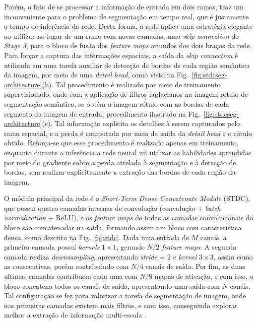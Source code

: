 \documentclass[conference]{IEEEtran}
\begin{document}
Porém, o fato de se processar a informação de entrada em dois ramos, traz um inconveniente para o problema de segmentação em tempo real, que é justamente o tempo de inferência da rede. Desta forma, a rede aplica uma estratégia elegante ao utilizar no lugar de um ramo com novas camadas, uma \textit{skip connection} do \textit{Stage 3}, para o bloco de fusão dos \textit{feature maps} oriundos dos dois braços da rede. Para forçar a captura das informações espaciais, a saída da \textit{skip connection} é utilizada em uma tarefa auxiliar de detecção de bordas de cada região semântica da imagem, por meio de uma \textit{detail head}, como visto na Fig.~\ref{fig:stdcseg-architecture}(b). Tal procedimento é realizado por meio de treinamento supervisionado, onde com a aplicação de filtros laplacianos na imagem rótulo de segmentação semântica, se obtém a imagem rótulo com as bordas de cada segmento da imagem de entrada, procedimento ilustrado na Fig.~\ref{fig:stdcseg-architecture}(c). Tal informação explicita os detalhes à serem capturados pelo ramo espacial, e a perda é computada por meio da saída da \textit{detail head} e o rótulo obtido. Reforça-se que esse procedimento é realizado apenas em treinamento, enquanto durante a inferência a rede neural irá utilizar as habilidades aprendidas por meio do gradiente sobre a perda atrelada à segmentação e à detecção de bordas, sem realizar explicitamente a extração das bordas de cada região da imagem.

O módulo principal da rede é o \textit{Short-Term Dense Concatenate Module} (STDC), que possuí quatro camadas internas de convolução (convolução + \textit{batch normalization} + ReLU), e os \textit{feature maps} de todas as camadas convolucionais do bloco são concatenadas na saída, formando assim um bloco com característica densa, como descrito na Fig. \ref{fig:stdc}. Dada uma entrada de $M$ canais, a primeira camada possuí \textit{kernels} $1 \times 1$, gerando $N/2$ \textit{feature maps}. A segunda camada realiza \textit{downsampling}, apresentando \textit{stride} = 2 e \textit{kernel} $3 \times 3$, assim como as consecutivas, porém contribuindo com $N/4$ canais de saída. Por fim, as duas ultimas camadas contribuem cada uma com $N/8$ mapas de ativação, e com isso, o bloco concatena todos os canais de saída, apresentando uma saída com $N$ canais. Tal configuração se fez para valorizar a tarefa de segmentação de imagem, onde nas primeiras camadas existem mais filtros, e com isso, conseguindo explorar melhor a extração de informação multi-escala \cite{fan2021RethinkingBiSeNetRealtime}.
\end{document}

